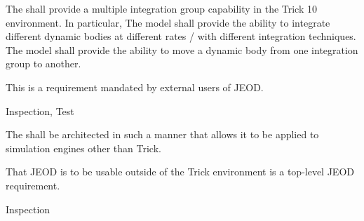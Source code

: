 \label{reqt:multiple_integ_groups}
\begin{description:}
\item[Requirement]
  The \ModelDesc shall provide a multiple integration group capability
  in the Trick 10 environment. In particular,
  The model shall provide the ability to
  integrate different dynamic bodies at different rates / with different
  integration techniques.
  The model shall provide the ability to
  move a dynamic body from one integration group to another.
\item[Rationale]
  This is a requirement mandated by external users of JEOD.
\item[Verification]
  Inspection, Test 
\end{description:}


\label{reqt:extensibility}
\begin{description:}
\item[Requirement]
  The \ModelDesc shall be architected in such a manner that
  allows it to be applied to simulation engines other than Trick.
\item[Rationale]
  That JEOD is to be usable outside of the Trick environment
  is a top-level JEOD requirement.
\item[Verification]
  Inspection
\end{description:}

